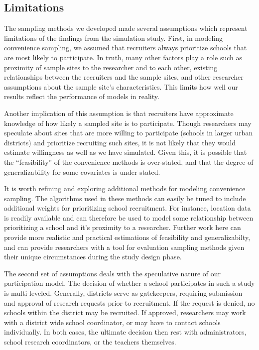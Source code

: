 \documentclass[man,floatsintext]{apa6}
\begin{document}
\hypertarget{limitations}{%
\subsection{Limitations}\label{limitations}}

The sampling methods we developed made several assumptions which represent limitations of the findings from the simulation study. First, in modeling convenience sampling, we assumed that recruiters always prioritize schools that are most likely to participate. In truth, many other factors play a role such as proximity of sample sites to the researcher and to each other, existing relationships between the recruiters and the sample sites, and other researcher assumptions about the sample site's characteristics. This limits how well our results reflect the performance of models in reality.

Another implication of this assumption is that recruiters have approximate knowledge of how likely a sampled site is to participate. Though researchers may speculate about sites that are more willing to participate (schools in larger urban districts) and prioritize recruiting such sites, it is not likely that they would estimate willingness as well as we have simulated. Given this, it is possible that the \enquote{feasibility} of the convenience methods is over-stated, and that the degree of generalizability for some covariates is under-stated.

It is worth refining and exploring additional methods for modeling convenience sampling. The algorithms used in these methods can easily be tuned to include additional weights for prioritizing school recruitment. For instance, location data is readily available and can therefore be used to model some relationship between prioritizing a school and it's proximity to a researcher. Further work here can provide more realistic and practical estimations of feasibility and generalizabilty, and can provide researchers with a tool for evaluation sampling methods given their unique circumstances during the study design phase.

The second set of assumptions deals with the speculative nature of our participation model. The decision of whether a school participates in such a study is multi-leveled. Generally, districts serve as gatekeepers, requiring submission and approval of research requests prior to recruitment. If the request is denied, no schools within the district may be recruited. If approved, researchers may work with a district wide school coordinator, or may have to contact schools individually. In both cases, the ultimate decision then rest with administrators, school research coordinators, or the teachers themselves.
\end{document}
